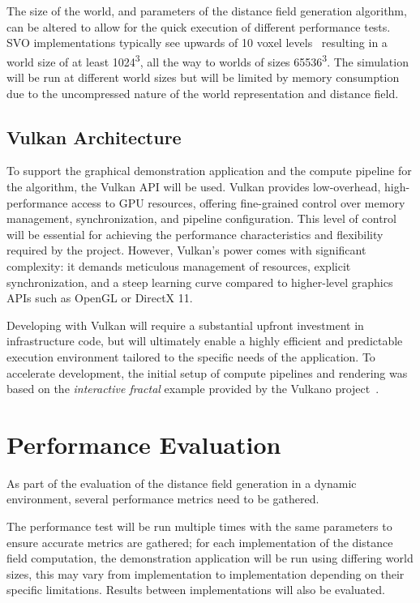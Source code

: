 The size of the world, and parameters of the distance field generation algorithm, can be altered to allow for the quick
execution of different performance tests. SVO implementations typically see upwards of 10 voxel
levels~\cite{laine2010efficient} resulting in a world size of at least 1024\textsuperscript{3}, all the way to worlds of
sizes 65536\textsuperscript{3}. The simulation will be run at different world sizes but will be limited by memory
consumption due to the uncompressed nature of the world representation and distance field.

\subsection{Vulkan Architecture}
To support the graphical demonstration application and the compute pipeline for the algorithm, the Vulkan API will be used.
Vulkan provides low-overhead, high-performance access to GPU resources, offering fine-grained control over memory
management, synchronization, and pipeline configuration. This level of control will be essential for achieving the
performance characteristics and flexibility required by the project. However, Vulkan's power comes with significant
complexity: it demands meticulous management of resources, explicit synchronization, and a steep learning curve compared
to higher-level graphics APIs such as OpenGL or DirectX 11.

Developing with Vulkan will require a substantial upfront investment in infrastructure code, but will ultimately enable
a highly efficient and predictable execution environment tailored to the specific needs of the application. To
accelerate development, the initial setup of compute pipelines and rendering was based on the
\textit{interactive fractal} example provided by the Vulkano project~\cite{vulkano-example}.

\section{Performance Evaluation}\label{sec:perf_eval}
As part of the evaluation of the distance field generation in a dynamic environment, several performance metrics need to
be gathered.

The performance test will be run multiple times with the same parameters to ensure accurate metrics are gathered; for
each implementation of the distance field computation, the demonstration application will be run using differing world
sizes, this may vary from implementation to implementation depending on their specific limitations. Results between
implementations will also be evaluated.

